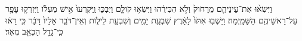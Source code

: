 \documentclass{openreader}
\begin{document}
וַיִּשְׂא֨וּ אֶת־עֵינֵיהֶ֤ם מֵרָחֹוק֙ וְלֹ֣א הִכִּירֻ֔הוּ וַיִּשְׂא֥וּ קֹולָ֖ם וַיִּבְכּ֑וּ וַֽיִּקְרְעוּ֙ אִ֣ישׁ מְעִלֹ֔ו וַיִּזְרְק֥וּ עָפָ֛ר עַל־רָאשֵׁיהֶ֖ם הַשָּׁמָֽיְמָה׃ 
וַיֵּשְׁב֤וּ אִתֹּו֙ לָאָ֔רֶץ שִׁבְעַ֥ת יָמִ֖ים וְשִׁבְעַ֣ת לֵילֹ֑ות וְאֵין־דֹּבֵ֤ר אֵלָיו֙ דָּבָ֔ר כִּ֣י רָא֔וּ כִּֽי־גָדַ֥ל הַכְּאֵ֖ב מְאֹֽד׃ 
\end{document}
